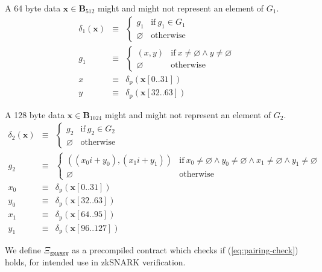 \documentclass[9pt,oneside]{amsart}
\begin{document}
A 64 byte data $\mathbf{x}\in\mathbf{B}_{512}$ might and might not represent an element of $G_1$.
\begin{eqnarray}
\delta_1(\mathbf{x})&\equiv&\begin{cases}
g_1&\text{if}\ g_1\in G_1\\
\varnothing&\text{otherwise}
\end{cases}\\
g_1&\equiv&\begin{cases}
(x,y)&\text{if}\ x\neq\varnothing\wedge y\neq\varnothing\\
\varnothing&\text{otherwise}
\end{cases}\\
x&\equiv&\delta_{\mathrm{p}}(\mathbf{x}[0..31])\\
y&\equiv&\delta_{\mathrm{p}}(\mathbf{x}[32..63])
\end{eqnarray}

A 128 byte data $\mathbf{x}\in\mathbf{B}_{1024}$ might and might not represent an element of $G_2$.
\begin{eqnarray}
\delta_2(\mathbf{x})&\equiv&\begin{cases}
g_2&\text{if}\ g_2\in G_2\\
\varnothing&\text{otherwise}
\end{cases}\\
g_2&\equiv&\begin{cases}
((x_0i+y_0),(x_1i+y_1))&\text{if}\ x_0\neq\varnothing\wedge y_0\neq\varnothing\wedge x_1\neq\varnothing\wedge y_1\neq\varnothing\\
\varnothing&\text{otherwise}
\end{cases}\\
x_0&\equiv&\delta_{\mathrm{p}}(\mathbf{x}[0..31])\\
y_0&\equiv&\delta_{\mathrm{p}}(\mathbf{x}[32..63])\\
x_1&\equiv&\delta_{\mathrm{p}}(\mathbf{x}[64..95])\\
y_1&\equiv&\delta_{\mathrm{p}}(\mathbf{x}[96..127])
\end{eqnarray}

We define $\Xi_{\mathtt{SNARKV}}$ as a precompiled contract which checks if (\ref{eq:pairing-check}) holds, for intended use in zkSNARK verification.
\end{document}
